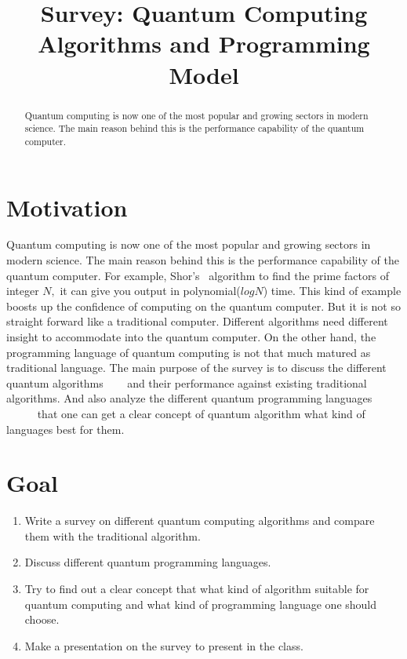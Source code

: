 \documentclass[11pt, conference, onecolumn]{IEEEtran}
\begin{document}
\title{Survey: Quantum Computing Algorithms and Programming Model}

\author{
}


\maketitle

%

\begin{abstract}
 Quantum computing is now one of the most popular and growing sectors in modern science. The main reason behind this 
is the performance capability of the quantum computer.
\end{abstract}

\section{Motivation}
Quantum computing is now one of the most popular and growing sectors in modern science. The main reason behind this 
is the performance capability of the quantum computer. For example, Shor's~\cite{shor1994algorithms} algorithm to find 
the prime factors of integer $N,$ it can give you output in polynomial($log N$) time. This kind of example boosts up the 
confidence of computing on the quantum computer. But it is not so straight forward like a traditional computer. Different algorithms 
need different insight to accommodate into the quantum computer. On the other hand, the programming language 
of quantum computing is not that much matured as traditional language. The main purpose of the survey is to discuss 
the different quantum algorithms ~\cite{shor1994algorithms}~\cite{simon1997power}~\cite{gall2014improved}
and their performance against existing traditional algorithms. And also analyze the different quantum programming languages 
~\cite{knill1996conventions}~\cite{selinger2004towards}~\cite{bettelli2003toward}~\cite{omer1998procedural}~\cite{sanders2000quantum} 
that one can get a clear concept of quantum algorithm what kind of languages best for them.

\section{Goal}
\begin{enumerate}
\item Write a survey on different quantum computing algorithms and compare them with the traditional algorithm.
\item Discuss different quantum programming languages.
\item Try to find out a clear concept that what kind of algorithm suitable for quantum computing and what kind 
of programming language one should choose.
\item Make a presentation on the survey to present in the class.
\end{enumerate}
\end{document}
